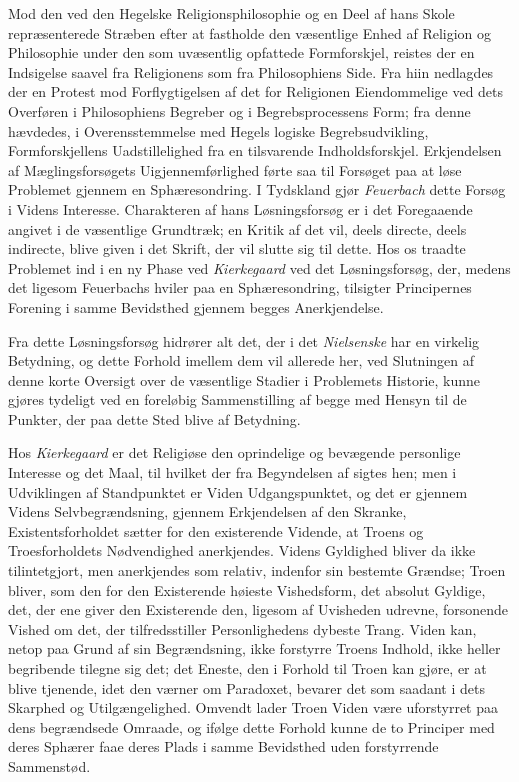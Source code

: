 \documentclass[12pt,a4paper]{book}
\newcommand{\opage}[1]{\marginnote{\footnotesize\textit{[#1]}}}
\begin{document}
Mod den ved den Hegelske Religionsphilosophie og en Deel af hans Skole
repræsenterede Stræben efter at fastholde den væsentlige Enhed af Religion og
Philosophie under den som uvæsentlig opfattede Formforskjel, reistes der en
Indsigelse saavel fra Religionens som fra Philosophiens \opage{26}Side. Fra hiin nedlagdes
der en Protest mod Forflygtigelsen af det for Religionen Eiendommelige ved dets
Overføren i Philosophiens Begreber og i Begrebsprocessens Form; fra denne
hævdedes, i Overensstemmelse med Hegels logiske Begrebsudvikling,
Formforskjellens Uadstillelighed fra en tilsvarende Indholdsforskjel. Erkjendelsen
af Mæglingsforsøgets Uigjennemførlighed førte saa til Forsøget paa at løse
Problemet gjennem en Sphæresondring. I Tydskland gjør \emph{Feuerbach} dette Forsøg i
Videns Interesse. Charakteren af hans Løsningsforsøg er i det Foregaaende angivet
i de væsentlige Grundtræk; en Kritik af det vil, deels directe, deels indirecte,
blive given i det Skrift, der vil slutte sig til dette. Hos os traadte Problemet
ind i en ny Phase ved \emph{Kierkegaard} ved det Løsningsforsøg, der, medens det ligesom
Feuerbachs hviler paa en Sphæresondring, tilsigter Principernes Forening i samme
Bevidsthed gjennem begges Anerkjendelse.

Fra dette Løsningsforsøg hidrører alt det, der i det \emph{Nielsenske} har en virkelig
Betydning, og dette Forhold imellem dem vil allerede her, ved Slutningen af denne
korte Oversigt over de væsentlige Stadier i Problemets Historie, kunne gjøres
tydeligt ved en foreløbig Sammenstilling af begge med Hensyn til de Punkter, der
paa dette Sted blive af Betydning.

Hos \emph{Kierkegaard} er det Religiøse den oprindelige og bevægende personlige
Interesse og det Maal, til hvilket der fra Begyndelsen af sigtes hen; men i
Udviklingen af Standpunktet er Viden Udgangspunktet, og det er gjennem Videns
Selvbegrændsning, gjennem Erkjendelsen af den Skranke, Existentsforholdet sætter
for den existerende Vidende, at Troens og Troesforholdets Nødvendighed
anerkjendes. Videns Gyldighed bliver da ikke tilintetgjort, men anerkjendes som
relativ, indenfor sin bestemte Grændse; Troen bliver, som den for den
Existerende høieste Vishedsform, det absolut Gyldige, det, der ene giver den
Existerende den, ligesom af Uvisheden udrevne, forsonende Vished om det, der
tilfredsstiller Personlighedens dybeste Trang. Viden \opage{27}kan, netop paa Grund af sin
Begrændsning, ikke forstyrre Troens Indhold, ikke heller begribende tilegne sig
det; det Eneste, den i Forhold til Troen kan gjøre, er at blive tjenende, idet
den værner om Paradoxet, bevarer det som saadant i dets Skarphed og
Utilgængelighed. Omvendt lader Troen Viden være uforstyrret paa dens begrændsede
Omraade, og ifølge dette Forhold kunne de to Principer med deres Sphærer faae
deres Plads i samme Bevidsthed uden forstyrrende Sammenstød.
\end{document}
